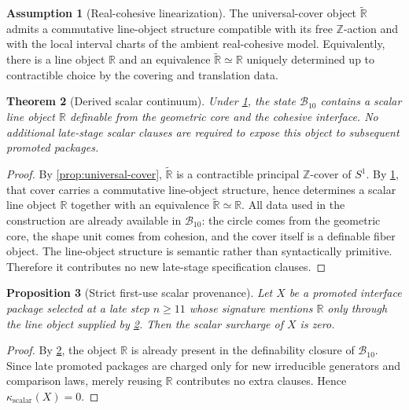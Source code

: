 \documentclass[11pt]{article}
\theoremstyle{plain}
\newtheorem{theorem}{Theorem}[section]
\newtheorem{proposition}[theorem]{Proposition}
\theoremstyle{definition}
\newtheorem{assumption}[theorem]{Assumption}
\theoremstyle{remark}
\newcommand{\Z}{\mathbb{Z}}
\newcommand{\R}{\mathbb{R}}
\newcommand{\B}{\mathcal{B}}
\begin{document}
\begin{assumption}[Real-cohesive linearization]
\label{ass:real-linearization}
The universal-cover object $\widetilde{\R}$ admits a commutative line-object structure compatible with its free $\Z$-action and with the local interval charts of the ambient real-cohesive model. Equivalently, there is a line object $\R$ and an equivalence $\widetilde{\R}\simeq\R$ uniquely determined up to contractible choice by the covering and translation data.
\end{assumption}

\begin{theorem}[Derived scalar continuum]
\label{thm:derived-scalar}
Under \cref{ass:real-linearization}, the state $\B_{10}$ contains a scalar line object $\R$ definable from the geometric core and the cohesive interface. No additional late-stage scalar clauses are required to expose this object to subsequent promoted packages.
\end{theorem}

\begin{proof}
By \cref{prop:universal-cover}, $\widetilde{\R}$ is a contractible principal $\Z$-cover of $S^1$. By \cref{ass:real-linearization}, that cover carries a commutative line-object structure, hence determines a scalar line object $\R$ together with an equivalence $\widetilde{\R}\simeq\R$. All data used in the construction are already available in $\B_{10}$: the circle comes from the geometric core, the shape unit comes from cohesion, and the cover itself is a definable fiber object. The line-object structure is semantic rather than syntactically primitive. Therefore it contributes no new late-stage specification clauses.
\end{proof}

\begin{proposition}[Strict first-use scalar provenance]
\label{prop:scalar-provenance}
Let $X$ be a promoted interface package selected at a late step $n\ge 11$ whose signature mentions $\R$ only through the line object supplied by \cref{thm:derived-scalar}. Then the scalar surcharge of $X$ is zero.
\end{proposition}

\begin{proof}
By \cref{thm:derived-scalar}, the object $\R$ is already present in the definability closure of $\B_{10}$. Since late promoted packages are charged only for new irreducible generators and comparison laws, merely reusing $\R$ contributes no extra clauses. Hence $\kappa_{\mathrm{scalar}}(X)=0$.
\end{proof}
\end{document}
